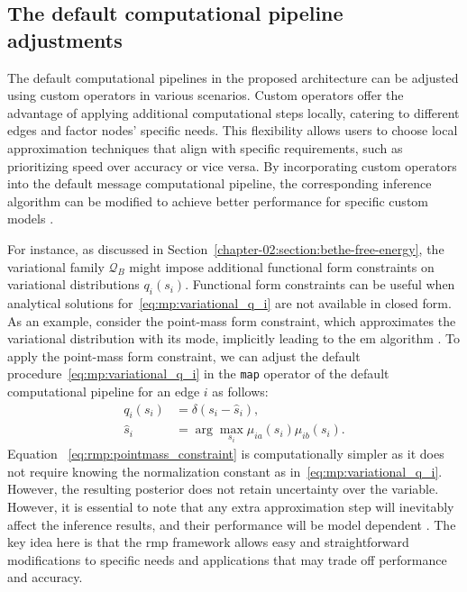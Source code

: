 \subsection{The default computational pipeline adjustments}

The default computational pipelines in the proposed architecture can be adjusted using custom
operators in various scenarios.
Custom operators offer the advantage of applying additional computational steps locally,
catering to different edges and factor nodes' specific needs.
This flexibility allows users to choose local approximation techniques that align with
specific requirements, such as prioritizing speed over accuracy or vice versa.
By incorporating custom operators into the default message computational pipeline, the
corresponding inference algorithm can be modified to achieve better performance for specific
custom models \citep{zhang_unifying_2021, akbayrak_reparameterization_2019}.

For instance, as discussed in Section~\ref{chapter-02:section:bethe-free-energy}, the
variational family $\mathcal{Q}_{B}$ might impose additional functional form constraints on
variational distributions $q_i(s_i)$.
Functional form constraints can be useful when analytical solutions
for~\eqref{eq:mp:variational_q_i} are not available in closed form.
As an example, consider the point-mass form constraint, which approximates the variational
distribution with its mode, implicitly leading to the \ac{em} algorithm \citep{senoz_variational_2021}.
To apply the point-mass form constraint, we can adjust the default
procedure~\eqref{eq:mp:variational_q_i} in the \texttt{map} operator of the default
computational pipeline for an edge $i$ as follows: \begin{equation}
  \label{eq:rmp:pointmass_constraint} \begin{split} q_i(s_i) &= \delta(s_i - \hat{s}_i), \\
  \hat{s}_i &= \arg\max_{s_i} \mu_{ia}(s_i) \mu_{ib}(s_i).
\end{split}
\end{equation}
Equation ~\eqref{eq:rmp:pointmass_constraint} is computationally simpler as it does not require
knowing the normalization constant as in~\eqref{eq:mp:variational_q_i}.
However, the resulting posterior does not retain uncertainty over the variable.
However, it is essential to note that any extra approximation step will inevitably affect the
inference results, and their performance will be model dependent
\citep{akbayrak_extended_2021}.
The key idea here is that the \ac{rmp} framework allows easy and straightforward modifications to
specific needs and applications that may trade off performance and accuracy.


